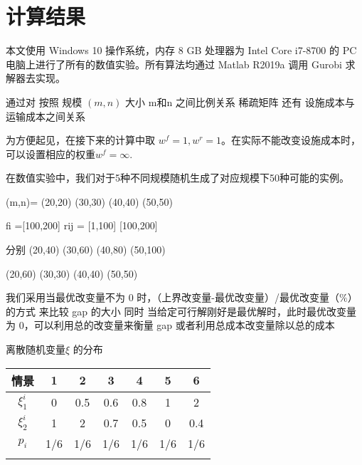 \documentclass[UTF8]{article}
\begin{document}
%
%

\section{计算结果}

本文使用 Windows 10 操作系统，内存 8 GB 处理器为 Intel Core i7-8700 的 PC 电脑上进行了所有的数值实验。所有算法均通过 Matlab R2019a 调用 Gurobi 求解器去实现。

通过对
按照 规模 $(m,n)$ 大小  m和n 之间比例关系 稀疏矩阵 还有  设施成本与运输成本之间关系

为方便起见，在接下来的计算中取 $w^f=1,w^r=1$。在实际不能改变设施成本时，可以设置相应的权重$w^f=\infty$.

在数值实验中，我们对于5种不同规模随机生成了对应规模下50种可能的实例。

(m,n)= (20,20) (30,30) (40,40) (50,50)

fi =[100,200] rij = [1,100] [100,200]

分别 (20,40) (30,60) (40,80) (50,100)

(20,60) (30,30) (40,40) (50,50)

我们采用当最优改变量不为 0 时，（上界改变量-最优改变量）/最优改变量（$\%$）的方式
来比较 gap 的大小
同时 当给定可行解刚好是最优解时，此时最优改变量为 0，可以利用总的改变量来衡量 gap 或者利用总成本改变量除以总的成本

{\small\begin{table}[h!]

\centerline{\small{\heiti{}}  离散随机变量$\xi$ 的分布}
\vskip 2mm
\centering
\begin{tabular}{ccccccc}
    \shline
情景&1&2&3&4&5&6\\
    \hline
$\xi_1^i$ & 0 & 0.5 & 0.6  & 0.8  & 1 & 2\\
$\xi_2^i$ & 1 & 2   & 0.7  & 0.5 & 0 & 0.4\\

$p_i$ &1/6&1/6&1/6&1/6&1/6&1/6\\
   \shline
 \end{tabular}
 \end{table}}
\end{document}
